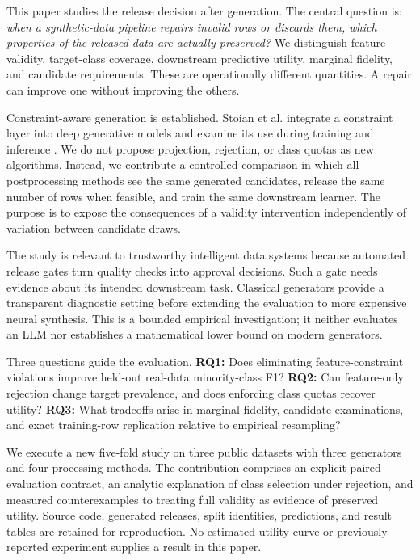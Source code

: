 \documentclass{svproc}
\begin{document}
This paper studies the release decision after generation. The central question is: \emph{when a synthetic-data pipeline repairs invalid rows or discards them, which properties of the released data are actually preserved?} We distinguish feature validity, target-class coverage, downstream predictive utility, marginal fidelity, and candidate requirements. These are operationally different quantities. A repair can improve one without improving the others.

Constraint-aware generation is established. Stoian et al. integrate a constraint layer into deep generative models and examine its use during training and inference \cite{stoian2024}. We do not propose projection, rejection, or class quotas as new algorithms. Instead, we contribute a controlled comparison in which all postprocessing methods see the same generated candidates, release the same number of rows when feasible, and train the same downstream learner. The purpose is to expose the consequences of a validity intervention independently of variation between candidate draws.

The study is relevant to trustworthy intelligent data systems because automated release gates turn quality checks into approval decisions. Such a gate needs evidence about its intended downstream task. Classical generators provide a transparent diagnostic setting before extending the evaluation to more expensive neural synthesis. This is a bounded empirical investigation; it neither evaluates an LLM nor establishes a mathematical lower bound on modern generators.

Three questions guide the evaluation. \textbf{RQ1:} Does eliminating feature-constraint violations improve held-out real-data minority-class F1? \textbf{RQ2:} Can feature-only rejection change target prevalence, and does enforcing class quotas recover utility? \textbf{RQ3:} What tradeoffs arise in marginal fidelity, candidate examinations, and exact training-row replication relative to empirical resampling?

We execute a new five-fold study on three public datasets with three generators and four processing methods. The contribution comprises an explicit paired evaluation contract, an analytic explanation of class selection under rejection, and measured counterexamples to treating full validity as evidence of preserved utility. Source code, generated releases, split identities, predictions, and result tables are retained for reproduction. No estimated utility curve or previously reported experiment supplies a result in this paper.
\end{document}
